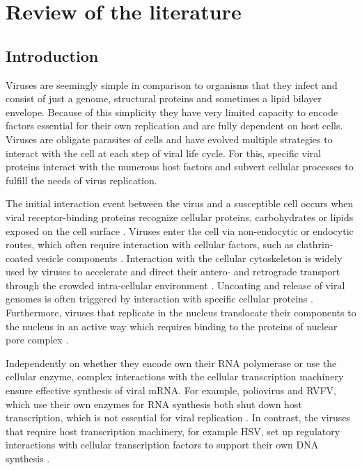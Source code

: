 \newpage
\setcounter{page}{1}
\doublespacing
\section{Review of the literature}

\subsection{Introduction}
	
	Viruses are seemingly simple in comparison to organisms that they infect and consist of just a genome, structural proteins and sometimes a lipid bilayer envelope. Because of this simplicity they have very limited capacity to encode factors essential for their own replication and are fully dependent on host cells. Viruses are obligate parasites of cells and have evolved multiple strategies to interact with the cell at each step of viral life cycle. For this, specific viral proteins interact with the numerous host factors and subvert cellular processes to fulfill the needs of virus replication. 
			
	The initial interaction event between the virus and a susceptible cell occurs when viral receptor-binding proteins recognize cellular proteins, carbohydrates or lipids exposed on the cell surface \parencite{Grove2011}. Viruses enter the cell via non-endocytic or endocytic routes, which often require interaction with cellular factors, such as clathrin-coated vesicle components \parencite{Dimitrov2004, Yamauchi2013}. Interaction with the cellular cytoskeleton is widely used by viruses to accelerate and direct their antero- and retrograde transport through the crowded intra-cellular environment \parencite{Ploubidou2001}. Uncoating and release of viral genomes is often triggered by interaction with specific cellular proteins \parencite{Suomalainen2013, Haywood2010}. Furthermore, viruses that replicate in the nucleus translocate their components to the nucleus in an active way which requires binding to the proteins of nuclear pore complex \parencite{Kobiler2012}.
				
	Independently on whether they encode own their RNA polymerase or use the cellular enzyme, complex interactions with the cellular transcription machinery ensure effective synthesis of viral mRNA. For example, poliovirus and \gls{RVFV}, which use their own enzymes for RNA synthesis both shut down host transcription, which is not essential for viral replication \parencite{Kundu2005, LeMay2004}. In contrast, the viruses that require host transcription machinery, for example \gls{HSV}, set up regulatory interactions with cellular transcription factors to support their own DNA synthesis \parencite{Wysocka2003}.

